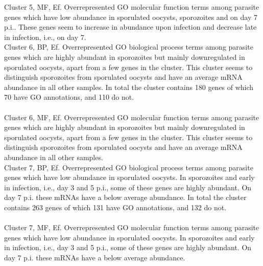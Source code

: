 \documentclass{article}
\begin{document}
Cluster 5, MF, Ef.
Overrepresented GO molecular function terms among parasite genes which have low abundance
in sporulated oocysts, sporozoites and on day 7 p.i.. These genes seem to increase in abundance
upon infection and decrease late in infection, i.e., on day 7.\\


Cluster 6, BP, Ef.
Overrepresented GO biological process terms among parasite genes which are highly abundant in sporozoites
but mainly downregulated in sporulated oocysts, apart from a few genes in the cluster.
This cluster seems to distinguish sporozoites from sporulated oocysts and have an average mRNA abundance in
all other samples. In total the cluster contains 180 genes of which 70 have GO annotations, and 110 do not.\\
 \\


Cluster 6, MF, Ef.
Overrepresented GO molecular function terms among parasite genes which are highly abundant in sporozoites
but mainly downregulated in sporulated oocysts, apart from a few genes in the cluster.
This cluster seems to distinguish sporozoites from sporulated oocysts and have an average mRNA abundance in
all other samples.\\


Cluster 7, BP, Ef.
Overrepresented GO biological process terms among parasite genes which have low abundance in sporulated oocysts.
In sporozoites and early in infection, i.e., day 3 and 5 p.i., some of these genes are highly abundant. On day
7 p.i. these mRNAs have a below average abundance. In total the cluster contains 263 genes of which 131 have 
GO annotations, and 132 do not.\\
 \\


Cluster 7, MF, Ef.
Overrepresented GO molecular function terms among parasite genes which have low abundance in sporulated oocysts.
In sporozoites and early in infection, i.e., day 3 and 5 p.i., some of these genes are highly abundant. On day
7 p.i. these mRNAs have a below average abundance.\\


\newpage
\end{document}
